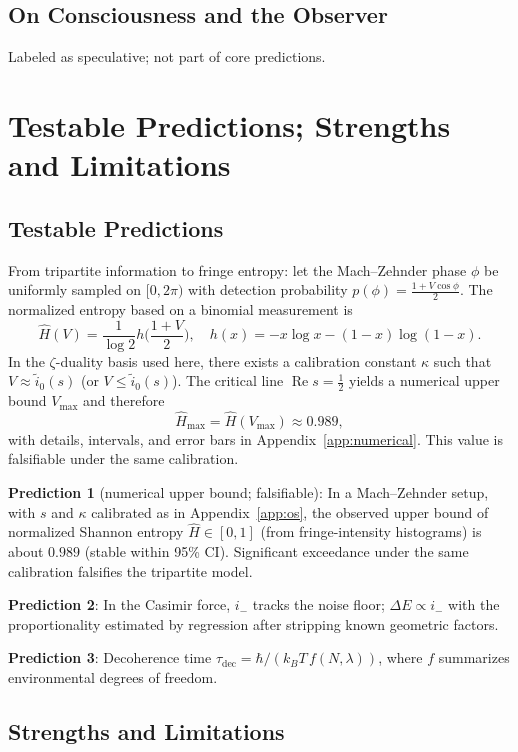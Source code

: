 \documentclass[11pt]{article}
\theoremstyle{definition}
\theoremstyle{remark}
\begin{document}
\subsection{On Consciousness and the Observer}

Labeled as speculative; not part of core predictions.

\section{Testable Predictions; Strengths and Limitations}\label{sec:predictions}

\subsection{Testable Predictions}

From tripartite information to fringe entropy: let the Mach--Zehnder phase \( \phi \) be uniformly sampled on \( [0,2\pi) \) with detection probability \( p(\phi)=\frac{1+V\cos\phi}{2} \). The normalized entropy based on a binomial measurement is
\[
\hat H(V)=\frac{1}{\log 2} h\Big(\frac{1+V}{2}\Big),\quad h(x)=-x\log x-(1-x)\log(1-x).
\]
In the \( \zeta \)-duality basis used here, there exists a calibration constant \( \kappa \) such that \( V\approx \tilde i_0(s) \) (or \( V\le \tilde i_0(s) \)). The critical line \( \operatorname{Re}s=\tfrac{1}{2} \) yields a numerical upper bound \( V_{\max} \) and therefore
\[
\hat H_{\max}=\hat H(V_{\max})\approx 0.989,
\]
with details, intervals, and error bars in Appendix~\ref{app:numerical}. This value is falsifiable under the same calibration.

\textbf{Prediction 1} (numerical upper bound; falsifiable): In a Mach--Zehnder setup, with \( s \) and \( \kappa \) calibrated as in Appendix~\ref{app:os}, the observed upper bound of normalized Shannon entropy \( \hat H\in[0,1] \) (from fringe-intensity histograms) is about \( 0.989 \) (stable within 95\% CI). Significant exceedance under the same calibration falsifies the tripartite model.

\textbf{Prediction 2}: In the Casimir force, \( i_- \) tracks the noise floor; \( \Delta E \propto i_- \) with the proportionality estimated by regression after stripping known geometric factors.

\textbf{Prediction 3}: Decoherence time \( \tau_{\text{dec}} = \hbar/(k_B T\, f(N,\lambda)) \), where \( f \) summarizes environmental degrees of freedom.

\subsection{Strengths and Limitations}
\end{document}
